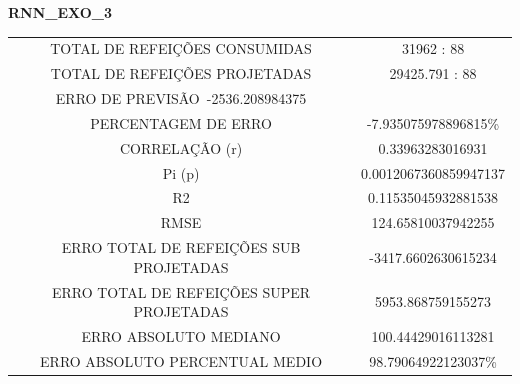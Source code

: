 \documentclass[	12pt, Times, openright, twoside, a4paper, english, brazil]{abntex2}
\begin{document}
                
              \textbf{RNN\_EXO\_3}
                \begin{figure}[H]
                \end{figure}

                \begin{figure}[H]
                \end{figure}
                
                    \begin{tabular}{|c|c|}
                    \rowcolor{gray!50}
                    \hline
               \multicolumn{2}{c}{ RNN\_EXO\_3:} \\ \hline
                TOTAL DE REFEIÇÕES CONSUMIDAS & 31962 : 88 \\
                TOTAL DE REFEIÇÕES PROJETADAS  & 29425.791 : 88 \\
                ERRO DE PREVISÃO\ -2536.208984375\\ 
                PERCENTAGEM DE ERRO &-7.935075978896815\% \\
                CORRELAÇÃO (r) & 0.33963283016931 \\ Pi (p)& 0.0012067360859947137 \\R2 & 0.11535045932881538\\
                RMSE & 124.65810037942255\\
                ERRO TOTAL DE REFEIÇÕES SUB PROJETADAS & -3417.6602630615234\\
                ERRO TOTAL DE REFEIÇÕES SUPER PROJETADAS & 5953.868759155273\\
                ERRO ABSOLUTO MEDIANO & 100.44429016113281\\
                ERRO ABSOLUTO PERCENTUAL MEDIO & 98.79064922123037\% \\ \hline \end{tabular}
\end{document}
